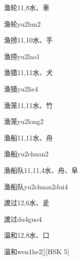 \begin{entry}{渔轮}{11,8}{⽔、⾞}
  \begin{phonetics}{渔轮}{yu2lun2}
  \end{phonetics}
\end{entry}

\begin{entry}{渔捞}{11,10}{⽔、⼿}
  \begin{phonetics}{渔捞}{yu2lao1}
  \end{phonetics}
\end{entry}

\begin{entry}{渔猎}{11,11}{⽔、⽝}
  \begin{phonetics}{渔猎}{yu2lie4}
  \end{phonetics}
\end{entry}

\begin{entry}{渔笼}{11,11}{⽔、⽵}
  \begin{phonetics}{渔笼}{yu2long2}
  \end{phonetics}
\end{entry}

\begin{entry}{渔船}{11,11}{⽔、⾈}
  \begin{phonetics}{渔船}{yu2chuan2}
  \end{phonetics}
\end{entry}

\begin{entry}{渔船队}{11,11,4}{⽔、⾈、⾩}
  \begin{phonetics}{渔船队}{yu2chuan2dui4}
  \end{phonetics}
\end{entry}

\begin{entry}{渡过}{12,6}{⽔、⾡}
  \begin{phonetics}{渡过}{du4guo4}
  \end{phonetics}
\end{entry}

\begin{entry}{温和}{12,8}{⽔、⼝}
  \begin{phonetics}{温和}{wen1he2}[][HSK 5]
  \end{phonetics}
\end{entry}

